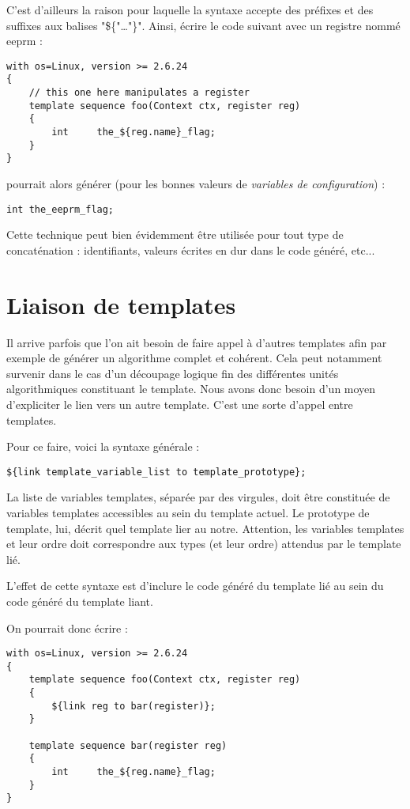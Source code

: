 \documentclass[french]{rtxreport}
\begin{document}
C'est d'ailleurs la raison pour laquelle la syntaxe accepte des préfixes et des
suffixes aux balises "\$\{"\ldots"\}". Ainsi, écrire le code suivant avec un
registre nommé eeprm :
\begin{lstlisting}
with os=Linux, version >= 2.6.24
{
    // this one here manipulates a register
    template sequence foo(Context ctx, register reg)
    {
        int     the_${reg.name}_flag;
    }
}
\end{lstlisting}

pourrait alors générer (pour les bonnes valeurs de \emph{variables de
configuration}) :
\lstset{language=C}
\begin{lstlisting}
int the_eeprm_flag;
\end{lstlisting}

Cette technique peut bien évidemment être utilisée pour tout type de
concaténation : identifiants, valeurs écrites en dur dans le code généré, etc...

\section{Liaison de templates}

Il arrive parfois que l'on ait besoin de faire appel à d'autres templates afin
par exemple de générer un algorithme complet et cohérent. Cela peut notamment
survenir dans le cas d'un découpage logique fin des différentes unités
algorithmiques constituant le template. Nous avons donc besoin d'un moyen
d'expliciter le lien vers un autre template. C'est une sorte d'appel entre
templates.

Pour ce faire, voici la syntaxe générale :
\begin{lstlisting}
${link template_variable_list to template_prototype};
\end{lstlisting}

La liste de variables templates, séparée par des virgules, doit être constituée
de variables templates accessibles au sein du template actuel. Le prototype de
template, lui, décrit quel template lier au notre. Attention, les variables
templates et leur ordre doit correspondre aux types (et leur ordre) attendus
par le template lié.

L'effet de cette syntaxe est d'inclure le code généré du template lié au sein
du code généré du template liant.

On pourrait donc écrire :
\begin{lstlisting}
with os=Linux, version >= 2.6.24
{
    template sequence foo(Context ctx, register reg)
    {
        ${link reg to bar(register)};
    }

    template sequence bar(register reg)
    {
        int     the_${reg.name}_flag;
    }
}
\end{lstlisting}
\end{document}
